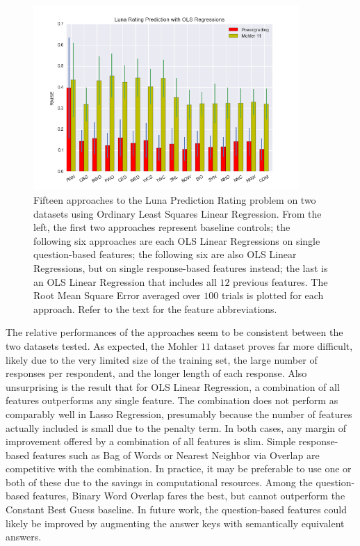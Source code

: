 \begin{figure}[h]
\centerline{%
\includegraphics[width=0.9\textwidth]{figures/ratingPredictionFinalResults2.png}%
}%
\caption{Fifteen approaches to the Luna Prediction Rating problem on two datasets using Ordinary Least Squares Linear Regression. From the left, the first two approaches represent baseline controls; the following six approaches are each OLS Linear Regressions on single question-based features; the following six are also OLS Linear Regressions, but on single response-based features instead; the last is an OLS Linear Regression that includes all $12$ previous features. The Root Mean Square Error averaged over $100$ trials is plotted for each approach. Refer to the text for the feature abbreviations.}
\label{fig:RatingDistribution}
\end{figure}

The relative performances of the approaches seem to be consistent between the two datasets tested. As expected, the Mohler $11$ dataset proves far more difficult, likely due to the very limited size of the training set, the large number of responses per respondent, and the longer length of each response. Also unsurprising is the result that for OLS Linear Regression, a combination of all features outperforms any single feature. The combination does not perform as comparably well in Lasso Regression, presumably because the number of features actually included is small due to the penalty term. In both cases, any margin of improvement offered by a combination of all features is slim. Simple response-based features such as Bag of Words or Nearest Neighbor via Overlap are competitive with the combination. In practice, it may be preferable to use one or both of these due to the savings in computational resources. Among the question-based features, Binary Word Overlap fares the best, but cannot outperform the Constant Best Guess baseline. In future work, the question-based features could likely be improved by augmenting the answer keys with semantically equivalent answers.

